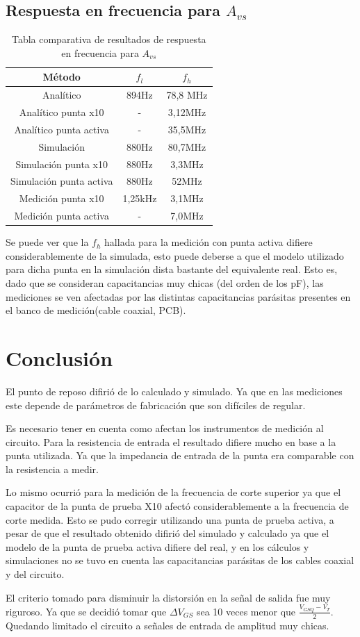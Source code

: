 \documentclass[10pt,spanish,a4paper,notitlepage]{article}
\begin{document}
\subsection{Respuesta en frecuencia para \texorpdfstring{$A_{vs}$}{TEXT}}
\begin{table}[H]
\centering
\begin{tabular}{|c|c|c|} 
\hline
Método & $f_l$&$f_h$ \\ \hline
Analítico & 894Hz & 78,8 MHz\\ \hline
Analítico punta x10 & - & 3,12MHz\\ \hline
Analítico punta activa& -  &35,5MHz \\ \hline
Simulación & 880Hz&80,7MHz \\ \hline
Simulación punta x10& 880Hz& 3,3MHz\\ \hline
Simulación punta activa&  880Hz&52MHz \\ \hline
Medición punta x10&1,25kHz &3,1MHz\\ \hline
Medición punta activa&- &7,0MHz\\ \hline
\end{tabular}
\caption{Tabla comparativa de resultados de respuesta en frecuencia para $A_{vs}$}
\label{table:compfrecuencias}
\end{table}

Se puede ver que la $f_h$ hallada para la medición con punta activa difiere considerablemente de la
simulada, esto puede deberse a que el modelo utilizado para dicha punta en la simulación 
dista bastante del equivalente real. Esto es, dado que se consideran capacitancias muy chicas (del
orden de los pF), las mediciones se ven afectadas por las distintas capacitancias parásitas presentes en el banco de medición(cable coaxial, PCB).

\section{Conclusión}

El punto de reposo difirió de lo calculado y simulado. Ya que en las mediciones
este depende de parámetros de fabricación que son difíciles de regular.

Es necesario tener en cuenta como afectan los instrumentos de medición al circuito.
Para la resistencia de entrada el resultado difiere mucho en base a la punta utilizada.
Ya que la impedancia de entrada de la punta era comparable con la resistencia a medir.

Lo mismo ocurrió para la medición de la frecuencia de corte superior ya que  el capacitor de la
punta de prueba X10 afectó considerablemente a la frecuencia de corte medida. Esto
se pudo corregir utilizando una punta de prueba activa, a pesar de que el resultado obtenido
difirió del simulado y calculado ya que el modelo de la punta de prueba activa
difiere del real, y en los cálculos y simulaciones no se tuvo en cuenta las capacitancias
parásitas de los cables coaxial y del circuito.

El criterio tomado para disminuir la distorsión en la señal de salida fue muy riguroso.
Ya que se decidió tomar que $\Delta V_{GS}$ sea 10 veces menor que $\frac{V_{GSQ}-V_T}{2}$.
Quedando limitado el circuito a señales de entrada de amplitud muy chicas. 
\end{document}
